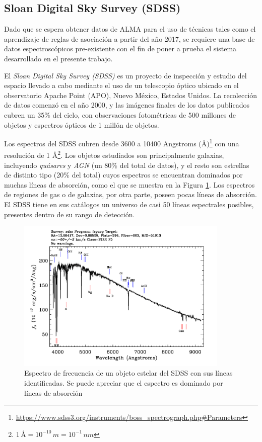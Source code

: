 \subsection{Sloan Digital Sky Survey (SDSS)}

Dado que se espera obtener datos de ALMA para el uso de técnicas tales como el aprendizaje de reglas de asociación a partir del año 2017, se requiere una base de datos espectroscópicos pre-existente con el fin de poner a prueba el sistema desarrollado en el presente trabajo.

El \textit{Sloan Digital Sky Survey (SDSS)}\cite{york2000sloan} es un proyecto de inspección y estudio del espacio llevado a cabo mediante el uso de un telescopio óptico ubicado en el observatorio Apache Point (APO), Nuevo México, Estados Unidos. La recolección de datos comenzó en el año 2000, y las imágenes finales de los datos publicados cubren un 35\% del cielo, con observaciones fotométricas de 500 millones de objetos y espectros ópticos de 1 millón de objetos.

Los espectros del SDSS cubren desde 3600 a 10400 Angstroms ({\AA})\footnote{\url{https://www.sdss3.org/instruments/boss_spectrograph.php\#Parameters}} con una resolución de 1 {\AA}\footnote{$1\,\text{{\AA}} = 10^{-10}\,m = 10^{-1}\,nm$}. Los objetos estudiados son principalmente galaxias, incluyendo \textit{quásares} y \textit{AGN} (un 80\% del total de datos), y el resto son estrellas de distinto tipo (20\% del total) cuyos espectros se encuentran dominados por muchas líneas de absorción, como el que se muestra en la Figura \ref{fig:sdss_spec}. Los espectros de regiones de gas o de galaxias, por otra parte, poseen pocas líneas de absorción. El SDSS tiene en sus catálogos un universo de casi 50 líneas espectrales posibles, presentes dentro de su rango de detección.

\begin{figure}[h!]
\begin{center}
\includegraphics[width=0.9\textwidth]{imagenes/sdss_spec.png}
\end{center}
\vspace*{-5mm}
\caption{Espectro de frecuencia de un objeto estelar del SDSS con sus líneas identificadas. Se puede apreciar que el espectro es dominado por líneas de absorción}
\label{fig:sdss_spec}
\end{figure}

